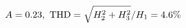 \documentclass[preview]{standalone}
\begin{document}
\begin{align*}
\special{dvisvgm:raw <g id='unique000'>}A=0.23,\ \text{THD}=\sqrt{H_2^2+H_3^2}/H_1=4.6\%\special{dvisvgm:raw </g>}
\end{align*}
\end{document}
